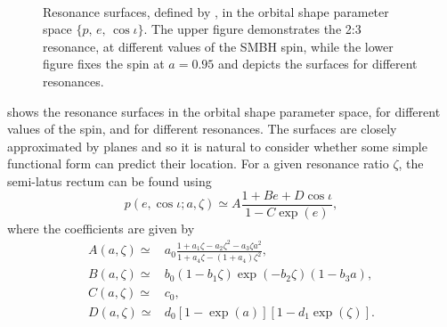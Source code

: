 \begin{figure}[htbp]
\centering
{}\\
\vspace{20pt}
\caption{\label{fig:res-resplane}Resonance surfaces, defined by , in the orbital shape parameter space $\{p,\,e,\,\cos\iota\}$. The upper figure demonstrates the 2:3 resonance, at different values of the SMBH spin, while the lower figure fixes the spin at $a=0.95$ and depicts the surfaces for different resonances.}
\end{figure}

 shows the resonance surfaces in the orbital shape parameter space, for different values of the spin, and for different resonances. The surfaces are closely approximated by planes and so it is natural to consider whether some simple functional form can predict their location. For a given resonance ratio $\zeta$, the semi-latus rectum can be found using
\begin{equation}
\label{eq:res-approx-p}
p(e,\cos\iota;a,\zeta) \simeq A\frac{1 + B e + D \cos\iota}{1 - C\exp(e)},
\end{equation}
where the coefficients are given by
\begin{subequations}
\begin{align} 
A(a,\zeta) \simeq {} & a_0\frac{1 + a_1\zeta - a_2 \zeta^2 - a_3 \zeta a^2}{1 + a_4\zeta - (1 + a_4)\zeta^2}, \\
B(a,\zeta) \simeq {} & b_0(1 - b_1\zeta)\exp(-b_2\zeta)(1 - b_3 a), \\
C(a,\zeta) \simeq {} & c_0, \\
D(a,\zeta) \simeq {} & d_0\left[1 - \exp(a)\right]\left[1 - d_1\exp(\zeta)\right].
\end{align}
\end{subequations}

